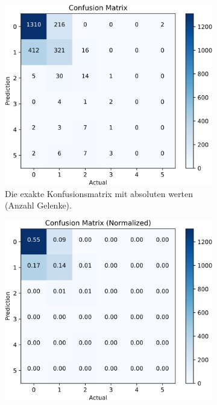 \begin{figure}[tbh]
    \centering
    \begin{subfigure}{0.45\textwidth}
        \includegraphics[width=\linewidth]{pics/confusion_matrix.png}
        \caption{Die exakte Konfusionsmatrix mit absoluten werten (Anzahl Gelenke).}
    \end{subfigure}
    \hfill
    \begin{subfigure}{0.45\textwidth}
        \includegraphics[width=\linewidth]{pics/confusion_matrix_norm.png}

\end{subfigure}
\end{figure}
